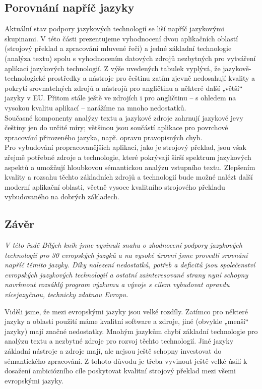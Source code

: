 \begin{multicols}{2}
\subsection{Porovnání napříč jazyky}

Aktuální stav podpory jazykových technologií se liší napříč jazykovými skupinami. V této části prezentujeme vyhodnocení dvou aplikačních oblastí (strojový překlad a zpracování mluvené řeči) a jedné základní technologie (analýza textu) spolu s vyhodnocením datových zdrojů nezbytných pro vytváření aplikací jazykových technologií. 
Z výše uvedených tabulek vyplývá, že jazykově-technologické prostředky a nástroje pro češtinu zatím zjevně nedosahují kvality a pokrytí srovnatelných zdrojů a nástrojů pro angličtinu a některé další „větší“ jazyky v EU. Přitom stále ještě ve zdrojích i pro angličtinu – s ohledem na vysokou kvalitu aplikací – narážíme na mnoho nedostatků.\\ 
Současné komponenty analýzy textu a jazykové zdroje zahrnují jazykové jevy češtiny jen do určité míry; většinou jsou součástí aplikace pro povrchové zpracování přirozeného jazyka, např. opravu pravopisných chyb.\\
Pro vybudování propracovanějších aplikací, jako je strojový překlad, jsou však zřejmě potřebné zdroje a technologie, které pokrývají širší spektrum jazykových aspektů a umožňují hloubkovou sémantickou analýzu vstupního textu. Zlepšením kvality a rozsahu těchto základních zdrojů a technologií bude možné nalézt další moderní aplikační oblasti, včetně vysoce kvalitního strojového překladu vybudovaného na dobrých základech.

\subsection{Závěr}

\emph{V této řadě Bílých knih jsme vyvinuli snahu o zhodnocení podpory jazykových technologií pro 30 evropských jazyků a na vysoké úrovni jsme provedli srovnání napříč těmito jazyky. Díky nalezení nedostatků, potřeb a deficitů jsou společenství evropských jazykových technologií a ostatní zainteresované strany nyní schopny navrhnout rozsáhlý program výzkumu a vývoje s cílem vybudovat opravdu vícejazyčnou, technicky zdatnou Evropu.}
\vspace*{0.009 cm}

Viděli jsme, že mezi evropskými jazyky jsou velké rozdíly. Zatímco pro některé jazyky a oblasti použití máme kvalitní software a zdroje, jiné (obvykle „menší“ jazyky) mají značné nedostatky. Mnohým jazykům chybí základní technologie pro analýzu textu a nezbytné zdroje pro rozvoj těchto technologií. Jiné jazyky základní nástroje a zdroje mají, ale nejsou ještě schopny investovat do sémantického zpracování. Z tohoto důvodu je třeba vyvinout ještě velké úsilí k dosažení ambiciózního cíle poskytovat kvalitní strojový překlad mezi všemi evropskými jazyky. 
\vspace*{0.009 cm}


\end{multicols}
